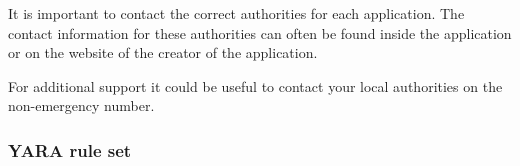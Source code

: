 It is important to contact the correct authorities for each application. 
The contact information for these authorities can often be found inside the application or on the website of the creator of the application.

For additional support it could be useful to contact your local authorities on the non-emergency number.

\newpage
\subsubsection{YARA rule set}

% 
